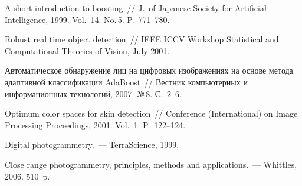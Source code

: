 \begin{multicols}{2}
{{\begin{thebibliography}{9}
A short introduction to boosting~// J.~of Japanese Society for Artificial Intelligence, 1999. Vol.~14. No.\,5. P.~771--780.

Robust real time object detection~// IEEE ICCV Workshop Statistical and Computational Theories of Vision, July 2001.

Автоматическое обнаружение лиц на цифровых изображениях на основе метода адаптивной классификации AdaBoost~// Вестник 
компьютерных и информационных технологий, 2007. №\,8. С.~2--6.

\label{end\stat}

Optimum color spaces for skin detection~// Conference (International) on Image Processing Proceedings, 2001. Vol.~1. P.~122--124.

Digital photogrammetry.~--- TerraScience, 1999. 

Close range photogrammetry, principles, methods and applications.~--- Whittles, 2006.  510~p. 


 \end{thebibliography}
}
}
\end{multicols}